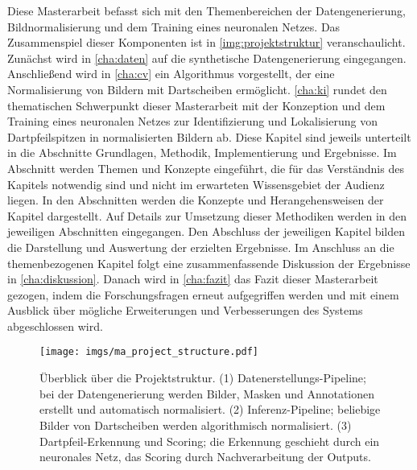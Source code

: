 Diese Masterarbeit befasst sich mit den Themenbereichen der Datengenerierung, Bildnormalisierung und dem Training eines neuronalen Netzes. Das Zusammenspiel dieser Komponenten ist in \autoref{img:projektstruktur} veranschaulicht. Zunächst wird in \autoref{cha:daten} auf die synthetische Datengenerierung eingegangen. Anschließend wird in \autoref{cha:cv} ein Algorithmus vorgestellt, der eine Normalisierung von Bildern mit Dartscheiben ermöglicht. \autoref{cha:ki} rundet den thematischen Schwerpunkt dieser Masterarbeit mit der Konzeption und dem Training eines neuronalen Netzes zur Identifizierung und Lokalisierung von Dartpfeilspitzen in normalisierten Bildern ab. Diese Kapitel sind jeweils unterteilt in die Abschnitte Grundlagen, Methodik, Implementierung und Ergebnisse. Im Abschnitt  werden Themen und Konzepte eingeführt, die für das Verständnis des Kapitels notwendig sind und nicht im erwarteten Wissensgebiet der Audienz liegen. In den Abschnitten  werden die Konzepte und Herangehensweisen der Kapitel dargestellt. Auf Details zur Umsetzung dieser Methodiken werden in den jeweiligen Abschnitten  eingegangen. Den Abschluss der jeweiligen Kapitel bilden die Darstellung und Auswertung der erzielten Ergebnisse. Im Anschluss an die themenbezogenen Kapitel folgt eine zusammenfassende Diskussion der Ergebnisse in \autoref{cha:diskussion}. Danach wird in \autoref{cha:fazit} das Fazit dieser Masterarbeit gezogen, indem die Forschungsfragen erneut aufgegriffen werden und mit einem Ausblick über mögliche Erweiterungen und Verbesserungen des Systems abgeschlossen wird.

\begin{figure}
    \centering
    \texttt{[image: imgs/ma\_project\_structure.pdf]}
    \caption{Überblick über die Projektstruktur. (1) Datenerstellungs-Pipeline; bei der Datengenerierung werden Bilder, Masken und Annotationen erstellt und automatisch normalisiert. (2) Inferenz-Pipeline; beliebige Bilder von Dartscheiben werden algorithmisch normalisiert. (3) Dartpfeil-Erkennung und Scoring; die Erkennung geschieht durch ein neuronales Netz, das Scoring durch Nachverarbeitung der Outputs.}
    \label{img:projektstruktur}
\end{figure}


